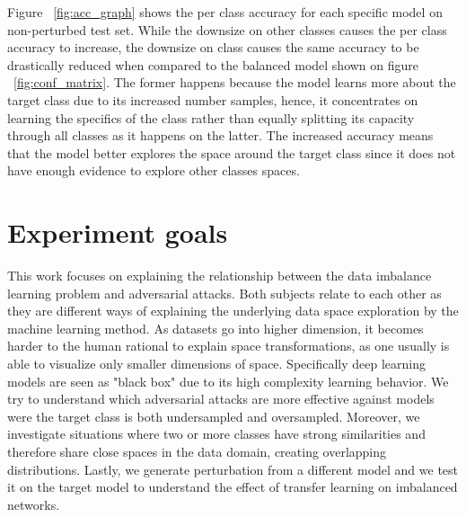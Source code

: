 Figure ~\ref{fig:acc_graph} shows the per class accuracy for each specific model on non-perturbed test set. While the downsize on other classes causes the per class accuracy to increase, the downsize on class causes the same accuracy to be drastically reduced when compared to the balanced model shown on figure ~\ref{fig:conf_matrix}. The former happens because the model learns more about the target class due to its increased number samples, hence, it concentrates on learning the specifics of the class rather than equally splitting its capacity through all classes as it happens on the latter. The increased accuracy means that the model better explores the space around the target class since it does not have enough evidence to explore other classes spaces.

\section{Experiment goals}
This work focuses on explaining the relationship between the data imbalance learning problem and adversarial attacks. Both subjects relate to each other as they are different ways of explaining the underlying data space exploration by the machine learning method. As datasets go into higher dimension, it becomes harder to the human rational to explain space transformations, as one usually is able to visualize only smaller dimensions of space. Specifically deep learning models are seen as "black box" due to its high complexity learning behavior. We try to understand which adversarial attacks are more effective against models were the target class is both undersampled and oversampled. Moreover, we investigate situations where two or more classes have strong similarities and therefore share close spaces in the data domain, creating overlapping distributions. Lastly, we generate perturbation from a different model and we test it on the target model to understand the effect of transfer learning on imbalanced networks.
